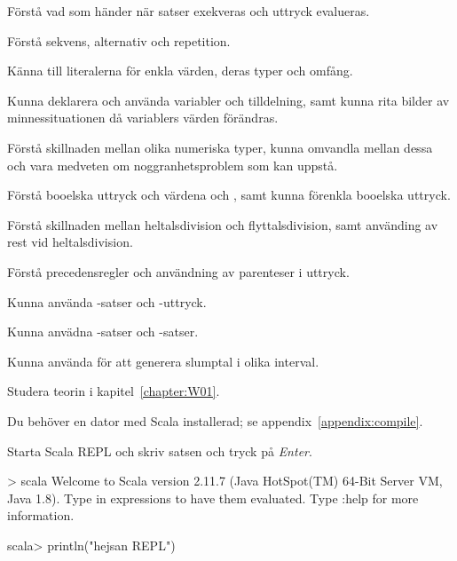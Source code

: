 
\Exercise{\ExeWeekONE}\label{exe:W01}

\begin{Goals}
\item Förstå vad som händer när satser exekveras och uttryck evalueras.
\item Förstå sekvens, alternativ och repetition.
\item Känna till literalerna för enkla värden, deras typer och omfång.
\item Kunna deklarera och använda variabler och tilldelning, samt kunna rita bilder av minnessituationen då variablers värden förändras.
\item Förstå skillnaden mellan olika numeriska typer, kunna omvandla mellan dessa och vara medveten om noggranhetsproblem som kan uppstå.
\item Förstå booelska uttryck och värdena  och , samt kunna förenkla booelska uttryck.
\item Förstå skillnaden mellan heltalsdivision och flyttalsdivision, samt använding av rest vid heltalsdivision.
\item Förstå precedensregler och användning av parenteser i uttryck.
\item Kunna använda -satser och -uttryck.
\item Kunna anvädna -satser och -satser.
\item Kunna använda  för att generera slumptal i olika interval.
\end{Goals}

\begin{Preparations}
\item Studera teorin i kapitel~\ref{chapter:W01}.
\item Du behöver en dator med Scala installerad; se appendix~\ref{appendix:compile}.
\end{Preparations}

\BasicTasks

\Task Starta Scala REPL  och skriv satsen  och tryck på \textit{Enter}. 

\begin{REPL}
> scala
Welcome to Scala version 2.11.7 (Java HotSpot(TM) 64-Bit Server VM, Java 1.8).
Type in expressions to have them evaluated.
Type :help for more information.

scala> println("hejsan REPL")
\end{REPL}

